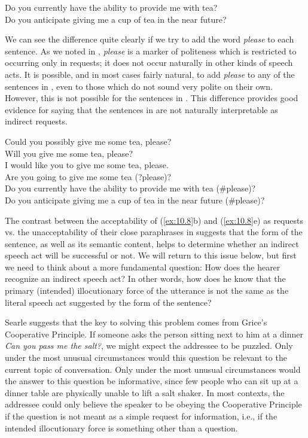   
\ea \label{ex:10.9}
\ea  Do you currently have the ability to provide me with tea?\\
\ex Do you anticipate giving me a cup of tea in the near future?
                       \z
\z


We can see the difference quite clearly if we try to add the word \textit{please} to each sentence. As we noted in , \textit{please} is a marker of politeness which is restricted to occurring only in requests; it does not occur naturally in other kinds of speech acts. It is possible, and in most cases fairly natural, to add \textit{please} to any of the sentences in , even to those which do not sound very polite on their own. However, this is not possible for the sentences in . This difference provides good evidence for saying that the sentences in  are not naturally interpretable as indirect requests.


\ea \label{ex:10.10}
\ea Could you possibly give me some tea, please?\\
\ex Will you give me some tea, please?\\
\ex I would like you to give me some tea, please.\\
\ex Are you going to give me some tea (?please)?\\
\ex Do you currently have the ability to provide me with tea (\#please)?\\
\ex Do you anticipate giving me a cup of tea in the near future (\#please)?
\z \z


The contrast between the acceptability of (\ref{ex:10.8}b) and (\ref{ex:10.8}e) as requests vs. the unacceptability of their close paraphrases in  suggests that the form of the sentence, as well as its semantic content, helps to determine whether an indirect speech act will be successful or not. We will return to this issue below, but first we need to think about a more fundamental question: How does the hearer recognize an indirect speech act? In other words, how does he know that the primary (intended) illocutionary force of the utterance is not the same as the literal speech act suggested by the form of the sentence?



Searle suggests that the key to solving this problem comes from Grice’s Cooperative Principle. If someone asks the person sitting next to him at a dinner \textit{Can you pass me the salt?}, we might expect the addressee to be puzzled. Only under the most unusual circumstances would this question be relevant to the current topic of conversation. Only under the most unusual circumstances would the answer to this question be informative, since few people who can sit up at a dinner table are physically unable to lift a salt shaker. In most contexts, the addressee could only believe the speaker to be obeying the Cooperative Principle if the question is not meant as a simple request for information, i.e., if the intended illocutionary force is something other than a question.



